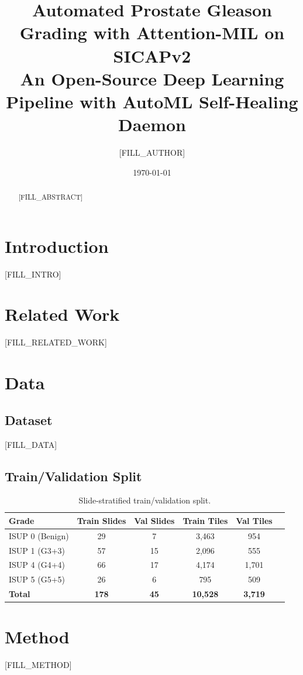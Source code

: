 \documentclass[11pt,a4paper]{article}
\title{\textbf{Automated Prostate Gleason Grading with Attention-MIL on SICAPv2}\\
\large An Open-Source Deep Learning Pipeline with AutoML Self-Healing Daemon}
\author{[FILL\_AUTHOR]}
\date{\today}
\begin{document}
\maketitle

\begin{abstract}
[FILL\_ABSTRACT]
\end{abstract}

\section{Introduction}
[FILL\_INTRO]

\section{Related Work}
[FILL\_RELATED\_WORK]

\section{Data}
\subsection{Dataset}
[FILL\_DATA]

\subsection{Train/Validation Split}
\begin{table}[h]
\centering
\begin{tabular}{lccccc}
\toprule
Grade & Train Slides & Val Slides & Train Tiles & Val Tiles \\
\midrule
ISUP 0 (Benign) & 29 & 7 & 3,463 & 954 \\
ISUP 1 (G3+3)   & 57 & 15 & 2,096 & 555 \\
ISUP 4 (G4+4)   & 66 & 17 & 4,174 & 1,701 \\
ISUP 5 (G5+5)   & 26 & 6 & 795 & 509 \\
\midrule
\textbf{Total}  & \textbf{178} & \textbf{45} & \textbf{10,528} & \textbf{3,719} \\
\bottomrule
\end{tabular}
\caption{Slide-stratified train/validation split.}
\end{table}

\section{Method}
[FILL\_METHOD]
\end{document}
